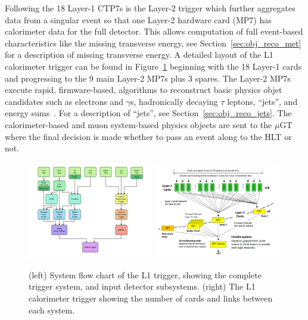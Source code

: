 Following the 18 Layer-1 CTP7s is the Layer-2 trigger which further aggregates
data from a singular event so that one Layer-2 hardware card (MP7) has calorimeter data for
the full detector. This allows computation
of full event-based characteristics like the missing transverse energy, see 
Section~\ref{sec:obj_reco_met} for a description of missing transverse energy. A detailed
layout of the L1 calorimeter trigger can be found in Figure~\ref{fig:cms_l1t} beginning
with the 18 Layer-1 cards and progressing to the 9 main Layer-2 MP7s plus 3 spares.
The Layer-2 MP7s execute rapid, firmware-based, algorithms to reconstruct basic physics
objet candidates such as electrons and $\gamma$s, hadronically decaying $\tau$ leptons, 
``jets'', and energy sums~\cite{Cadamuro:2017slr}. For a description of ``jets'', 
see Section~\ref{sec:obj_reco_jets}.
The calorimeter-based and muon system-based physics objects are sent to the $\mu$GT
where the final decision is made whether to pass an event along to the HLT or not.

\begin{figure}[htbp]
\centering
     \includegraphics[width=0.49\textwidth]{cms_and_lhc/plots/cms_l1t_system.pdf}
     \includegraphics[width=0.49\textwidth]{cms_and_lhc/plots/cms_l1t_hardware.pdf}
     \caption{
(left) System flow chart of the L1 trigger, showing the complete trigger system, and
input detector subsystems.
(right) The L1 calorimeter trigger showing the number of cards and links between
each system.
     }
     \label{fig:cms_l1t}
\end{figure}

